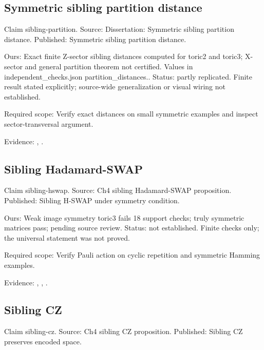 \subsection{Symmetric sibling partition distance}\label{claim:sibling-partition}
Claim sibling-partition. Source: Dissertation: Symmetric sibling partition distance. Published: Symmetric sibling partition distance.

Ours: Exact finite Z-sector sibling distances computed for toric2 and toric3; X-sector and general partition theorem not certified. Values in independent\_checks.json partition\_distances.. Status: partly replicated. Finite result stated explicitly; source-wide generalization or visual wiring not established.

Required scope: Verify exact distances on small symmetric examples and inspect sector-transversal argument.

Evidence: \href{https://github.com/alectionary/vibe-math/blob/master/formalization/quintavalle-hgp/sources/browser-extraction.txt}{}, \href{https://github.com/alectionary/vibe-math/blob/master/formalization/quintavalle-hgp/availability.md}{}.
\subsection{Sibling Hadamard-SWAP}\label{claim:sibling-hswap}
Claim sibling-hswap. Source: Ch4 sibling Hadamard-SWAP proposition. Published: Sibling H-SWAP under symmetry condition.

Ours: Weak image symmetry toric3 fails 18 support checks; truly symmetric matrices pass; pending source review. Status: not established. Finite checks only; the universal statement was not proved.

Required scope: Verify Pauli action on cyclic repetition and symmetric Hamming examples.

Evidence: \href{https://github.com/alectionary/vibe-math/blob/master/formalization/quintavalle-hgp/sources/browser-extraction.txt}{}, \href{https://github.com/alectionary/vibe-math/blob/master/formalization/quintavalle-hgp/availability.md}{}, \href{https://github.com/alectionary/vibe-math/blob/master/formalization/quintavalle-hgp/results/exact_checks.json}{}.
\subsection{Sibling CZ}\label{claim:sibling-cz}
Claim sibling-cz. Source: Ch4 sibling CZ proposition. Published: Sibling CZ preserves encoded space.

